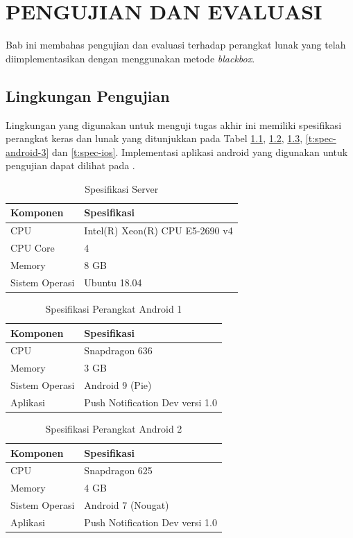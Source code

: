\chapter{PENGUJIAN DAN EVALUASI}
\par Bab ini membahas pengujian dan evaluasi terhadap perangkat lunak yang telah diimplementasikan dengan menggunakan metode \textit{blackbox}.

\section{Lingkungan Pengujian}
\par Lingkungan yang digunakan untuk menguji tugas akhir ini memiliki spesifikasi perangkat keras dan lunak yang ditunjukkan pada Tabel \ref{t:spec-server}, \ref{t:spec-android}, \ref{t:spec-android-2}, \ref{t:spec-android-3} dan \ref{t:spec-ios}. Implementasi aplikasi android yang digunakan untuk pengujian dapat dilihat pada .
\begin{longtable}{|p{3cm}|p{6cm}|}
	\caption{Spesifikasi Server} \label{t:spec-server} \\ \hline
    \rowcolor{lightgray} Komponen & Spesifikasi \\ \hline
    CPU & Intel(R) Xeon(R) CPU E5-2690 v4 \\ \hline
    CPU Core & 4 \\ \hline
    Memory & 8 GB \\ \hline
    Sistem Operasi & Ubuntu 18.04 \\ \hline
\end{longtable}
\begin{longtable}{|p{3cm}|p{6cm}|}
	\caption{Spesifikasi Perangkat Android 1} \label{t:spec-android} \\ \hline
	\rowcolor{lightgray} Komponen & Spesifikasi \\ \hline
    CPU & Snapdragon 636 \\ \hline
    Memory & 3 GB \\ \hline
    Sistem Operasi & Android 9 (Pie) \\ \hline
    Aplikasi & Push Notification Dev versi 1.0 \\ \hline
\end{longtable}
\pagebreak
\begin{longtable}{|p{3cm}|p{6cm}|}
\caption{Spesifikasi Perangkat Android 2} \label{t:spec-android-2} \\ \hline
\rowcolor{lightgray} Komponen & Spesifikasi \\ \hline
CPU & Snapdragon 625 \\ \hline
Memory & 4 GB \\ \hline
Sistem Operasi & Android 7 (Nougat) \\ \hline
Aplikasi & Push Notification Dev versi 1.0 \\ \hline
\end{longtable}
